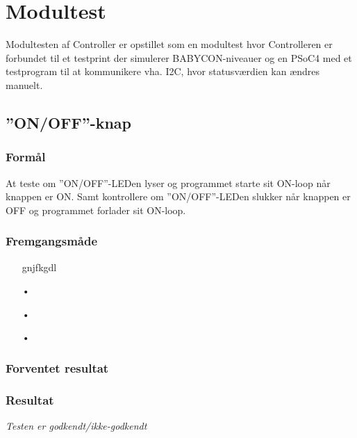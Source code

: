 \section{Modultest}

Modultesten af Controller er opstillet som en modultest hvor Controlleren er forbundet til et testprint der simulerer BABYCON-niveauer og en PSoC4 med et testprogram til at kommunikere vha. I2C, hvor statusværdien kan ændres manuelt.

\subsection*{''ON/OFF''-knap}

\subsubsection*{Formål}

At teste om ''ON/OFF''-LEDen lyser og programmet starte sit ON-loop når knappen er ON. Samt kontrollere om ''ON/OFF''-LEDen slukker når knappen er OFF og programmet forlader sit ON-loop.

\subsubsection*{Fremgangsmåde}
\begin{enumerate}
\item[gnjfkgdl]
\item[•]
\item[•]
\item[•]
\end{enumerate}


\subsubsection*{Forventet resultat} 



\subsubsection*{Resultat} 


\textit{Testen er godkendt/ikke-godkendt}